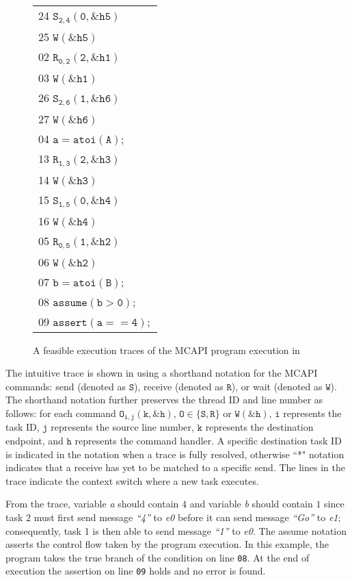 \begin{figure}[h]
\begin{center}
\setlength{\tabcolsep}{2pt}
\scriptsize \begin{tabular}[t]{l}
24 $\mathtt{S_{2,4}(0,\&h5)}$ \\
25 $\mathtt{W(\&h5)}$\\
\hline
02 $\mathtt{R_{0,2}(2,\&h1)}$ \\
03 $\mathtt{W(\&h1)}$ \\
\hline
26 $\mathtt{S_{2,6}(1,\&h6)}$ \\
27 $\mathtt{W(\&h6)}$ \\
\hline
04 $\mathtt{a = atoi(A);}$ \\
\hline
13 $\mathtt{R_{1,3}(2,\&h3)}$ \\
14 $\mathtt{W(\&h3)}$ \\
15 $\mathtt{S_{1,5}(0,\&h4)}$ \\
16 $\mathtt{W(\&h4)}$ \\
\hline
05 $\mathtt{R_{0,5}(1,\&h2)}$ \\
06 $\mathtt{W(\&h2)}$ \\
07 $\mathtt{b = atoi(B);}$ \\
08 $\mathtt{assume (b > 0);}$ \\
09 $\mathtt{assert(a == 4);}$ \\
\end{tabular}
\end{center}
\caption{A feasible  execution traces of the MCAPI program execution in }
\label{fig:trace1}
\end{figure}

The intuitive trace is shown in  using a shorthand
notation for the MCAPI commands: send (denoted as $\mathtt{S}$),
receive (denoted as $\mathtt{R}$), or wait (denoted as $\mathtt{W}$).
The shorthand notation further preserves the thread ID and line number
as follows: for each command $\mathtt{O_{i,j}(k,\&h)}$, $\mathtt{O \in
  \{S,R\}}$ or $\mathtt{W(\&h)}$, $\mathtt{i}$ represents the task ID,
$\mathtt{j}$ represents the source line number, $\mathtt{k}$
represents the destination endpoint, and $\mathtt{h}$ represents the
command handler. A specific destination task ID is indicated in the
notation when a trace is fully resolved, otherwise ``*" notation
indicates that a receive has yet to be matched to a specific send. The
lines in the trace indicate the context switch where a new task
executes.

From the trace, variable \textit{a} should contain $4$ and variable
\textit{b} should contain $1$ since task 2 must first send message
\textit{``4''} to \textit{e0} before it can send message
\textit{``Go''} to \textit{e1}; consequently, task 1 is then able to
send message \textit{``1''} to \textit{e0}. The assume notation
asserts the control flow taken by the program execution. In this
example, the program takes the true branch of the condition on line
\texttt{08}.  At the end of execution the assertion on line
\texttt{09} holds and no error is found.

